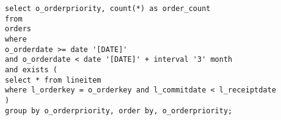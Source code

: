 \begin{minipage}{\linewidth}
\begin{lstlisting}[breaklines=true, numbers=none, label=q4, caption=Query 4]
select o_orderpriority, count(*) as order_count
from
orders
where
o_orderdate >= date '[DATE]'
and o_orderdate < date '[DATE]' + interval '3' month
and exists (
select * from lineitem
where l_orderkey = o_orderkey and l_commitdate < l_receiptdate
)
group by o_orderpriority, order by, o_orderpriority;
\end{lstlisting}
\end{minipage}






